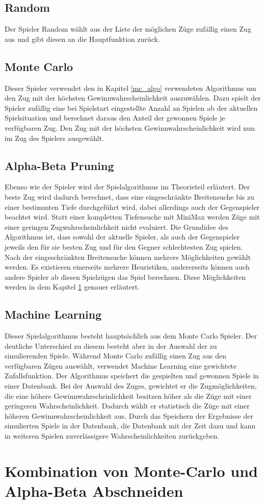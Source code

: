 \subsection{Random}
Der Spieler Random wählt aus der Liste der möglichen Züge zufällig einen Zug aus und gibt diesen an die Hauptfunktion zurück.

\subsection{Monte Carlo}
Dieser Spieler verwendet den in Kapitel \ref{mc_algo} verwendeten Algorithmus um den Zug mit der höchsten Gewinnwahrscheinlichkeit auszuwählen. Dazu spielt der Spieler zufällig eine bei Spielstart eingestellte Anzahl an Spielen ab der aktuellen Spielsituation und berechnet daraus den Anteil der gewonnen Spiele je verfügbaren Zug. Den Zug mit der höchsten Gewinnwahrscheinlichkeit wird nun im  Zug des Spielers ausgewählt.

\subsection{Alpha-Beta Pruning}
Ebenso wie der Spieler  wird der Spielalgorithmus im Theorieteil erläutert. Der beste Zug wird dadurch berechnet, dass eine eingeschränkte Breitensuche bis zu einer bestimmten Tiefe durchgeführt wird, dabei allerdings auch der Gegenspieler beachtet wird.
Statt einer kompletten Tiefensuche mit MiniMax werden Züge mit einer geringen Zugwahrscheinlichkeit nicht evaluiert. Die Grundidee des Algorithmus ist, dass sowohl der aktuelle Spieler, als auch der Gegenspieler jeweils den für sie besten Zug und für den Gegner schlechtesten Zug spielen.
\\Nach der eingeschränkten Breitensuche können mehrere Möglichkeiten gewählt werden.
Es existieren einerseits mehrere Heuristiken, andererseits können auch andere Spieler ab diesen Spielzügen das Spiel berechnen. Diese Möglichkeiten werden in dem Kapitel \ref{ab_comb} genauer erläutert.

\subsection{Machine Learning}
Dieser Spielalgorithmus besteht hauptsächlich aus dem Monte Carlo Spieler. Der deutliche Unterschied zu diesem besteht aber in der Auswahl der zu simulierenden Spiele. Während Monte Carlo zufällig einen Zug aus den verfügbaren Zügen auswählt, verwendet Machine Learning eine gewichtete Zufallsfunktion. Der Algorithmus speichert die gespielten und gewonnen Spiele in einer Datenbank. Bei der Auswahl des Zuges, gewichtet er die Zugmöglichkeiten, die eine höhere Gewinnwahrscheinlichkeit besitzen höher als die Züge mit einer geringeren Wahrscheinlichkeit. Dadurch wählt er statistisch die Züge mit einer höheren Gewinnwahrscheinlichkeit aus. Durch das Speichern der Ergebnisse der simulierten Spiele in der Datenbank,  die Datenbank mit der Zeit dazu und kann in weiteren Spielen zuverlässigere Wahrscheinlichkeiten zurückgeben.

\section{Kombination von Monte-Carlo und Alpha-Beta Abschneiden}
\label{ab_comb}